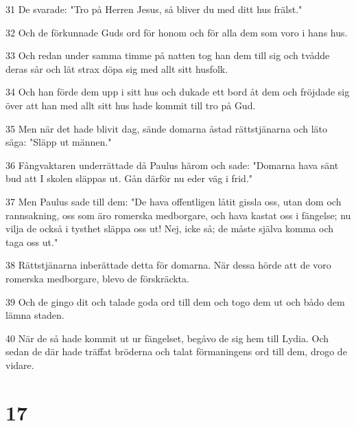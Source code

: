 \par 31 De svarade: "Tro på Herren Jesus, så bliver du med ditt hus frälst."
\par 32 Och de förkunnade Guds ord för honom och för alla dem som voro i hans hus.
\par 33 Och redan under samma timme på natten tog han dem till sig och tvådde deras sår och lät strax döpa sig med allt sitt husfolk.
\par 34 Och han förde dem upp i sitt hus och dukade ett bord åt dem och fröjdade sig över att han med allt sitt hus hade kommit till tro på Gud.
\par 35 Men när det hade blivit dag, sände domarna åstad rättstjänarna och läto säga: "Släpp ut männen."
\par 36 Fångvaktaren underrättade då Paulus härom och sade: "Domarna hava sänt bud att I skolen släppas ut. Gån därför nu eder väg i frid."
\par 37 Men Paulus sade till dem: "De hava offentligen låtit gissla oss, utan dom och rannsakning, oss som äro romerska medborgare, och hava kastat oss i fängelse; nu vilja de också i tysthet släppa oss ut! Nej, icke så; de måste själva komma och taga oss ut."
\par 38 Rättstjänarna inberättade detta för domarna. När dessa hörde att de voro romerska medborgare, blevo de förskräckta.
\par 39 Och de gingo dit och talade goda ord till dem och togo dem ut och bådo dem lämna staden.
\par 40 När de så hade kommit ut ur fängelset, begåvo de sig hem till Lydia. Och sedan de där hade träffat bröderna och talat förmaningens ord till dem, drogo de vidare.

\chapter{17}


